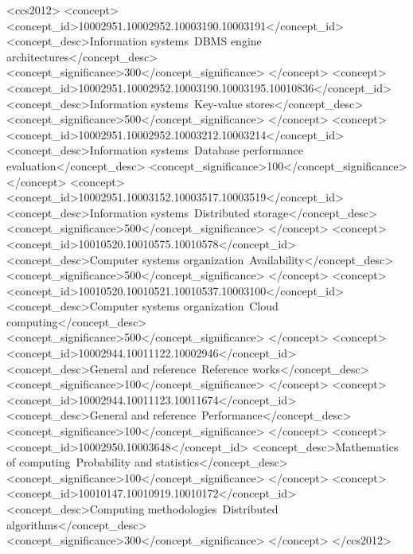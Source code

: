 \documentclass[sigconf]{acmart}
\begin{document}
\begin{CCSXML}
  <ccs2012>
  <concept>
  <concept_id>10002951.10002952.10003190.10003191</concept_id>
  <concept_desc>Information systems~DBMS engine architectures</concept_desc>
  <concept_significance>300</concept_significance>
  </concept>
  <concept>
  <concept_id>10002951.10002952.10003190.10003195.10010836</concept_id>
  <concept_desc>Information systems~Key-value stores</concept_desc>
  <concept_significance>500</concept_significance>
  </concept>
  <concept>
  <concept_id>10002951.10002952.10003212.10003214</concept_id>
  <concept_desc>Information systems~Database performance evaluation</concept_desc>
  <concept_significance>100</concept_significance>
  </concept>
  <concept>
  <concept_id>10002951.10003152.10003517.10003519</concept_id>
  <concept_desc>Information systems~Distributed storage</concept_desc>
  <concept_significance>500</concept_significance>
  </concept>
  <concept>
  <concept_id>10010520.10010575.10010578</concept_id>
  <concept_desc>Computer systems organization~Availability</concept_desc>
  <concept_significance>500</concept_significance>
  </concept>
  <concept>
  <concept_id>10010520.10010521.10010537.10003100</concept_id>
  <concept_desc>Computer systems organization~Cloud computing</concept_desc>
  <concept_significance>500</concept_significance>
  </concept>
  <concept>
  <concept_id>10002944.10011122.10002946</concept_id>
  <concept_desc>General and reference~Reference works</concept_desc>
  <concept_significance>100</concept_significance>
  </concept>
  <concept>
  <concept_id>10002944.10011123.10011674</concept_id>
  <concept_desc>General and reference~Performance</concept_desc>
  <concept_significance>100</concept_significance>
  </concept>
  <concept>
  <concept_id>10002950.10003648</concept_id>
  <concept_desc>Mathematics of computing~Probability and statistics</concept_desc>
  <concept_significance>100</concept_significance>
  </concept>
  <concept>
  <concept_id>10010147.10010919.10010172</concept_id>
  <concept_desc>Computing methodologies~Distributed algorithms</concept_desc>
  <concept_significance>300</concept_significance>
  </concept>
  </ccs2012>
\end{CCSXML}

\end{document}
